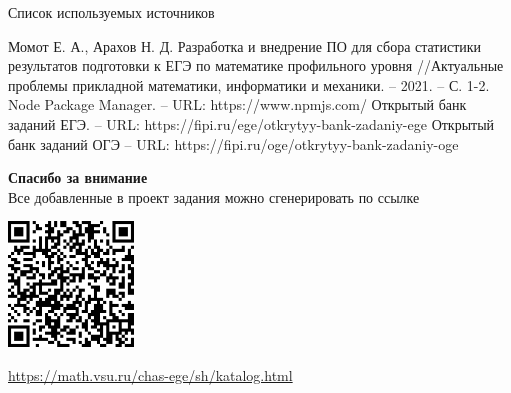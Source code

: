 \documentclass[aspectratio=169,12pt]{beamer}
\begin{document}
\begin{frame}{Список используемых источников}
	\begin{thebibliography}{10}
		 Момот Е. А., Арахов Н. Д. Разработка и внедрение ПО для сбора статистики результатов подготовки к ЕГЭ по математике профильного уровня //Актуальные проблемы прикладной математики, информатики и механики. – 2021. – С. 1-2.
		 Node Package Manager. – URL: https://www.npmjs.com/
		 Открытый банк заданий ЕГЭ. – URL: https://fipi.ru/ege/otkrytyy-bank-zadaniy-ege
		 Открытый банк заданий ОГЭ – URL:  https://fipi.ru/oge/otkrytyy-bank-zadaniy-oge
	\end{thebibliography}
\end{frame}

\begin{frame}
	\center\large\textcolor{NordBrightBlue}{\textbf{Спасибо за внимание}}\\
	\hfill \break
	\normalsize
	Все добавленные в проект задания можно сгенерировать по ссылке\\
	\hfill \break

	\includegraphics[width=0.25\textwidth]{images/QR-code}\\
	\hfill \break

	\url{https://math.vsu.ru/chas-ege/sh/katalog.html}
\end{frame}
\end{document}
